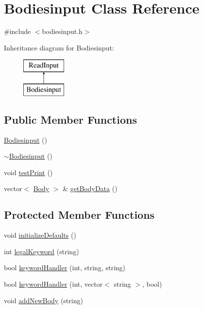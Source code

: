 \hypertarget{class_bodiesinput}{\section{Bodiesinput Class Reference}
\label{class_bodiesinput}
}


{\ttfamily \#include $<$bodiesinput.\-h$>$}

Inheritance diagram for Bodiesinput\-:\begin{figure}[H]
\begin{center}
\leavevmode
\includegraphics[height=2.000000cm]{class_bodiesinput}
\end{center}
\end{figure}
\subsection*{Public Member Functions}
\begin{DoxyCompactItemize}
\item 
\hyperlink{class_bodiesinput_a978009fcccf310bddf3ecb2261f7b9ed}{Bodiesinput} ()
\item 
\hyperlink{class_bodiesinput_ab478797f356b2d02c7be5a04c5e08d69}{$\sim$\-Bodiesinput} ()
\item 
void \hyperlink{class_bodiesinput_ab4dda6e4b858b9e349b5cc9ba155b4cd}{test\-Print} ()
\item 
vector$<$ \hyperlink{class_body}{Body} $>$ \& \hyperlink{class_bodiesinput_a0526664103347cd11e2b6fc15e8f8e61}{get\-Body\-Data} ()
\end{DoxyCompactItemize}
\subsection*{Protected Member Functions}
\begin{DoxyCompactItemize}
\item 
void \hyperlink{class_bodiesinput_ae7c0a7ee2c02e1ed63658a7d06f257e5}{initialize\-Defaults} ()
\item 
int \hyperlink{class_bodiesinput_abe777be6f9181f1d0f8c5ad523eff6e3}{legal\-Keyword} (string)
\item 
bool \hyperlink{class_bodiesinput_a2bf5785740ebd6e397477e667af16a05}{keyword\-Handler} (int, string, string)
\item 
bool \hyperlink{class_bodiesinput_af735a952cbd5b1a0c5db67c7209ba847}{keyword\-Handler} (int, vector$<$ string $>$, bool)
\item 
void \hyperlink{class_bodiesinput_a752cc5feeefe16345651b8133a132411}{add\-New\-Body} (string)
\end{DoxyCompactItemize}


